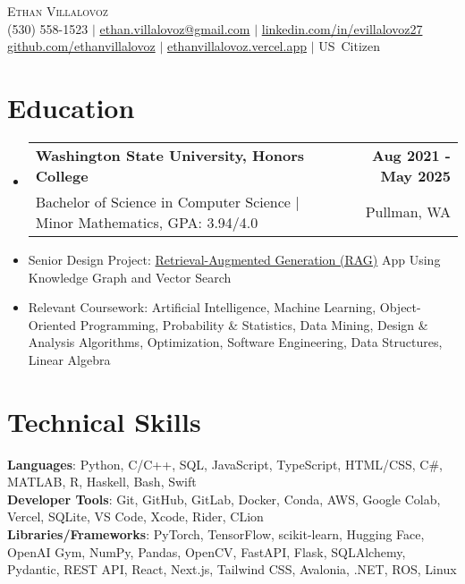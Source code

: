 \documentclass[letterpaper,11pt]{article}
\makeatletter
\newcommand{\resumeItem}[1]{
  \item\small{
    {#1 \vspace{0pt}}
  }
}
\newcommand{\resumeSubheading}[4]{
  \vspace{-2pt}\item
  \begin{tabular*}{1.0\textwidth}[t]{l@{\extracolsep{\fill}}r}
    \textbf{#1} & \textbf{\small #2} \\
    \textrm{\small#3} & \textrm{\small #4} \\
  \end{tabular*}\vspace{-7pt}
}
\newcommand{\resumeSubHeadingListStart}{\begin{itemize}[leftmargin=0.0in, label={}]}
\newcommand{\resumeSubHeadingListEnd}{\end{itemize}}\vspace{0pt}
\newcommand{\resumeItemListStart}{\begin{itemize}}
\newcommand{\resumeItemListEnd}{\end{itemize}\vspace{-5pt}}
\makeatother
\begin{document}
\begin{center}
  {\Large \scshape Ethan Villalovoz} \\[2mm]
  \footnotesize
  (530) 558-1523 $|$ 
  \href{mailto:ethan.villalovoz@gmail.com}{ethan.villalovoz@gmail.com} $|$
  \href{https://www.linkedin.com/in/evillalovoz27/}{linkedin.com/in/evillalovoz27} \\
  \href{https://github.com/ethanvillalovoz}{github.com/ethanvillalovoz} $|$
  \href{https://ethanvillalovoz.vercel.app/}{ethanvillalovoz.vercel.app} $|$
  US~Citizen
  \vspace{-8pt}
\end{center}

\section{Education}
\resumeSubHeadingListStart
  \resumeSubheading
    {Washington State University, Honors College}{Aug 2021 - May 2025}
    {Bachelor of Science in Computer Science | Minor Mathematics, GPA: 3.94/4.0 }{Pullman, WA}
\resumeSubHeadingListEnd

\resumeItemListStart
  \resumeItem{Senior Design Project: \href{https://github.com/mollyiverson/ACME10-HE-RAGApp}{Retrieval-Augmented Generation (RAG)} App Using Knowledge Graph and Vector Search}
  \vspace{-7pt}
  \resumeItem{Relevant Coursework: Artificial Intelligence, Machine Learning, Object-Oriented Programming, Probability \& Statistics, Data Mining, Design \& Analysis Algorithms, Optimization, Software Engineering, Data Structures, Linear Algebra}
\resumeItemListEnd

\vspace{-12pt}

\section{Technical Skills}

\small{
  \textbf{Languages}{: Python, C/C++, SQL, JavaScript, TypeScript, HTML/CSS, C\#, MATLAB, R, Haskell, Bash, Swift} \\[1mm]
  \textbf{Developer Tools}{: Git, GitHub, GitLab, Docker, Conda, AWS, Google Colab, Vercel, SQLite, VS Code, Xcode, Rider, CLion}\\[1mm]
  \textbf{Libraries/Frameworks}{: PyTorch, TensorFlow, scikit-learn, Hugging Face, OpenAI Gym, NumPy, Pandas, OpenCV, FastAPI, Flask, SQLAlchemy, Pydantic, REST API, React, Next.js, Tailwind CSS, Avalonia, .NET, ROS, Linux}
}
\end{document}
